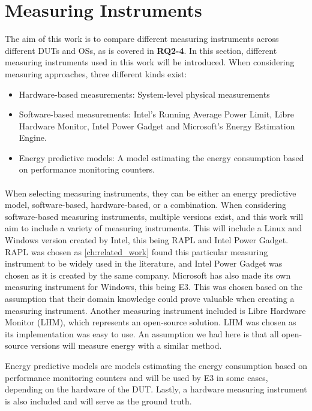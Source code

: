 \section{Measuring Instruments}\label{sec:measuring_instruments}

The aim of this work is to compare different measuring instruments across different DUTs and OSs, as is covered in \textbf{RQ2-4}. In this section, different measuring instruments used in this work will be introduced. When considering measuring approaches, three different kinds exist:

\begin{itemize}
    \item Hardware-based measurements: System-level physical measurements
    \item Software-based measurements: Intel's Running Average Power Limit, Libre Hardware Monitor, Intel Power Gadget and Microsoft's Energy Estimation Engine.
    \item Energy predictive models: A model estimating the energy consumption based on performance monitoring counters.
\end{itemize}

\paragraph*{}
When selecting measuring instruments, they can be either an energy predictive model, software-based, hardware-based, or a combination. When considering software-based measuring instruments, multiple versions exist, and this work will aim to include a variety of measuring instruments. This will include a Linux and Windows version created by Intel, this being RAPL and Intel Power Gadget. RAPL was chosen as \cref{ch:related_work} found this particular measuring instrument to be widely used in the literature, and Intel Power Gadget was chosen as it is created by the same company. Microsoft has also made its own measuring instrument for Windows, this being E3. This was chosen based on the assumption that their domain knowledge could prove valuable when creating a measuring instrument. Another measuring instrument included is Libre Hardware Monitor (LHM), which represents an open-source solution. LHM was chosen as its implementation was easy to use. An assumption we had here is that all open-source versions will measure energy with a similar method.\newline

Energy predictive models are models estimating the energy consumption based on performance monitoring counters and will be used by E3 in some cases, depending on the hardware of the DUT. Lastly, a hardware measuring instrument is also included and will serve as the ground truth.



